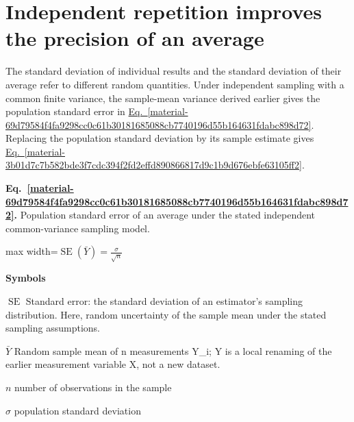 \documentclass[11pt,a4paper]{article}
\begin{document}
\clearpage
\section{Independent repetition improves the precision of an average}
The standard deviation of individual results and the standard deviation of their average refer to different random quantities. Under independent sampling with a common finite variance, the sample-mean variance derived earlier gives the population standard error in \hyperref[material-69d79584f4fa9298cc0c61b30181685088cb7740196d55b164631fdabc898d72]{Eq.~\ref*{material-69d79584f4fa9298cc0c61b30181685088cb7740196d55b164631fdabc898d72}}. Replacing the population standard deviation by its sample estimate gives \hyperref[material-3b01d7c7b582bde3f7cdc394f2fd2effd890866817d9c1b9d676ebfe63105ff2]{Eq.~\ref*{material-3b01d7c7b582bde3f7cdc394f2fd2effd890866817d9c1b9d676ebfe63105ff2}}.


\par\medskip
\noindent\begin{minipage}{\linewidth}
\label{material-69d79584f4fa9298cc0c61b30181685088cb7740196d55b164631fdabc898d72}
\noindent\textbf{Eq.~\ref*{material-69d79584f4fa9298cc0c61b30181685088cb7740196d55b164631fdabc898d72}.} Population standard error of an average under the stated independent common-variance sampling model.\par\nopagebreak
\begin{center}\begin{adjustbox}{max width=\linewidth}$\displaystyle \operatorname{SE}(\bar Y)=\frac{\sigma}{\sqrt n}$\end{adjustbox}\end{center}

\par\noindent\textbf{Symbols}

\par\noindent\textbf{\(\operatorname{SE}\)} Standard error: the standard deviation of an estimator's sampling distribution. Here, random uncertainty of the sample mean under the stated sampling assumptions.

\par\noindent\textbf{\(\bar Y\)} Random sample mean of n measurements Y\_i; Y is a local renaming of the earlier measurement variable X, not a new dataset.

\par\noindent\textbf{\(n\)} number of observations in the sample

\par\noindent\textbf{\(σ\)} population standard deviation

\end{minipage}\par
\medskip
\end{document}
